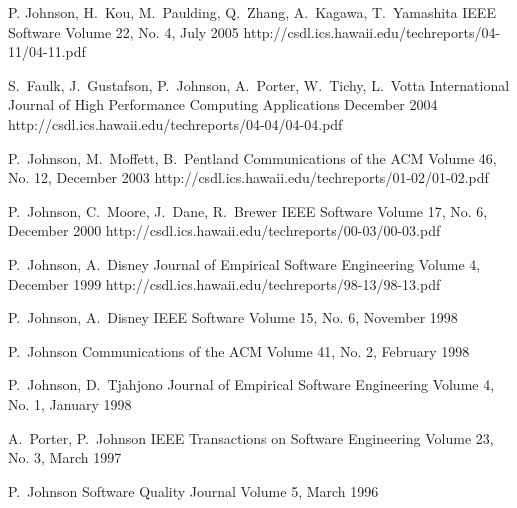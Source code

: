 \documentclass[11pt,letterpaper,sans]{moderncv} %
\begin{document}
          {P. Johnson, H.~Kou, M.~Paulding, Q.~Zhang, A.~Kagawa, T.~Yamashita}
          {IEEE Software}
          {Volume 22, No. 4, July 2005}
          {http://csdl.ics.hawaii.edu/techreports/04-11/04-11.pdf}

          {S.~Faulk, J.~Gustafson, P.~Johnson, A.~Porter, W.~Tichy, L.~Votta}
          {International Journal of High Performance Computing Applications}
          {December 2004}
          {http://csdl.ics.hawaii.edu/techreports/04-04/04-04.pdf}

          {P.~Johnson, M.~Moffett, B.~Pentland}
          {Communications of the ACM}
          {Volume 46, No. 12, December 2003}
          {http://csdl.ics.hawaii.edu/techreports/01-02/01-02.pdf}

          {P.~Johnson, C.~Moore, J.~Dane, R.~Brewer}
          {IEEE Software}
          {Volume 17, No. 6, December 2000}
          {http://csdl.ics.hawaii.edu/techreports/00-03/00-03.pdf}

          {P.~Johnson, A.~Disney}
          {Journal of Empirical Software Engineering}
          {Volume 4, December 1999}
          {http://csdl.ics.hawaii.edu/techreports/98-13/98-13.pdf}

          {P.~Johnson, A.~Disney}
          {IEEE Software}
          {Volume 15, No. 6, November 1998}

          {P.~Johnson}
          {Communications of the ACM}
          {Volume 41, No. 2, February 1998}

          {P.~Johnson, D.~Tjahjono}
          {Journal of Empirical Software Engineering}
          {Volume 4, No. 1, January 1998}

          {A.~Porter, P.~Johnson}
          {IEEE Transactions on Software Engineering}
          {Volume 23, No. 3, March 1997}

          {P.~Johnson}
          {Software Quality Journal}
          {Volume 5, March 1996}
\end{document}
